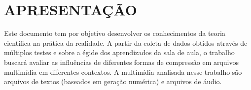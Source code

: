 \captionsetup{justification=centering,margin=0cm}

\chapter[APRESENTAÇÃO]{APRESENTAÇÃO}
Este documento tem por objetivo desenvolver os conhecimentos da teoria científica na prática da realidade. A partir da coleta de dados obtidos através de múltiplos testes e sobre a égide dos aprendizados da sala de aula, o trabalho buscará avaliar as influências de diferentes formas de compressão em arquivos multimídia em diferentes contextos. A multimídia analisada nesse trabalho são arquivos de textos (baseados em geração numérica) e arquivos de áudio.
